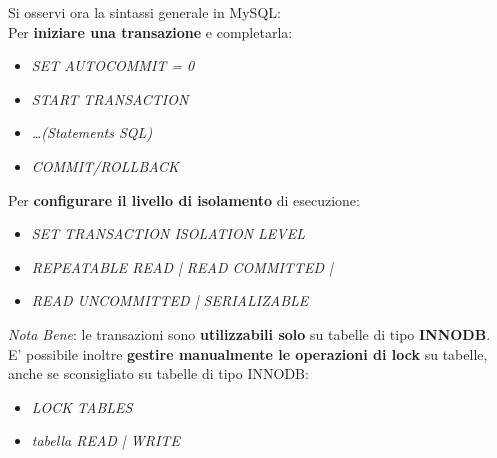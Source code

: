 \documentclass{article}
\begin{document}
Si osservi ora la sintassi generale in MySQL:\\
Per \textbf{iniziare una transazione} e completarla:
\begin{itemize}[label={ }, leftmargin=1cm]
    \item \textit{SET AUTOCOMMIT = 0}
    \item \textit{START TRANSACTION}
    \item \textit{\dots (Statements SQL)}
    \item \textit{COMMIT/ROLLBACK}
\end{itemize}
Per \textbf{configurare il livello di isolamento} di esecuzione:
\begin{itemize}[label={ }, leftmargin=1cm]
    \item \textit{SET TRANSACTION ISOLATION LEVEL}
    \item \quad \textit{REPEATABLE READ | READ COMMITTED | }
    \item \quad \textit{READ UNCOMMITTED | SERIALIZABLE}
\end{itemize}
\textit{Nota Bene}: le transazioni sono \textbf{utilizzabili solo} su tabelle di tipo \textbf{INNODB}.\vspace{14pt}\\
E' possibile inoltre \textbf{gestire manualmente le operazioni di lock} su tabelle, anche se sconsigliato su tabelle di tipo INNODB:
\begin{itemize}[label={ }, leftmargin=1cm]
    \item \textit{LOCK TABLES}
    \item \quad \textit{tabella {READ | WRITE}}
\end{itemize}
\end{document}
